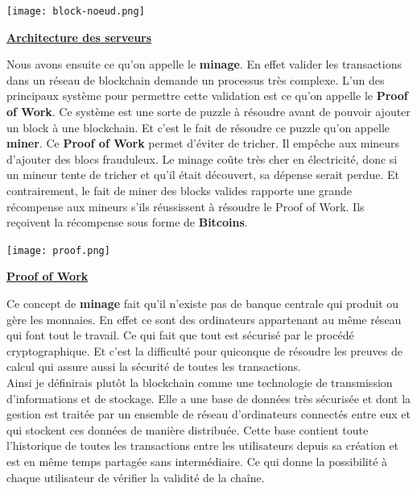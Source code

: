 \documentclass[12pt]{report}
\begin{document}
\begin{center}
    \texttt{[image: block-noeud.png]}

    \textbf{\underline{Architecture des serveurs }} \\[1cm]
\end{center}

\hspace{1cm} Nous avons ensuite ce qu'on appelle le \textbf{minage}. En effet valider les transactions dans un réseau de blockchain demande un processus très complexe. L'un des principaux système pour permettre cette validation est ce qu'on appelle le \textbf{Proof of Work}. Ce système est une sorte de puzzle à résoudre avant de pouvoir ajouter un block à une blockchain. Et c'est le fait de résoudre ce puzzle qu'on appelle \textbf{miner}. Ce \textbf{Proof of Work} permet d'éviter de tricher. Il empêche aux mineurs d'ajouter des blocs frauduleux. Le minage coûte très cher en électricité, donc si un mineur tente de tricher et qu'il était découvert, sa dépense serait perdue. Et contrairement, le fait de miner des blocks valides rapporte une grande récompense aux mineurs s'ils réussissent à résoudre le Proof of Work. Ils reçoivent la récompense sous forme de \textbf{Bitcoins}.

\begin{center}
    \texttt{[image: proof.png]}

    \textbf{\underline{Proof of Work}} \\[1cm]
\end{center}

\hspace{1cm} Ce concept de \textbf{minage} fait qu'il n'existe pas de banque centrale qui produit ou gère les monnaies. En effet ce sont des ordinateurs appartenant au même réseau qui font tout le travail. Ce qui fait que tout est sécurisé par le procédé cryptographique. Et c'est la difficulté pour quiconque de résoudre les preuves de calcul qui assure aussi la sécurité de toutes les transactions.\\

\hspace{1cm} Ainsi je définirais plutôt la blockchain comme une technologie de transmission d'informations et de stockage. Elle a une base de données très sécurisée et dont la gestion est traitée par un ensemble de réseau d'ordinateurs connectés entre eux et qui stockent ces données de manière distribuée. Cette base contient toute l'historique de toutes les transactions entre les utilisateurs depuis sa création et est en même temps partagée sans intermédiaire. Ce qui donne la possibilité à chaque utilisateur de vérifier la validité de la chaîne.
\end{document}
